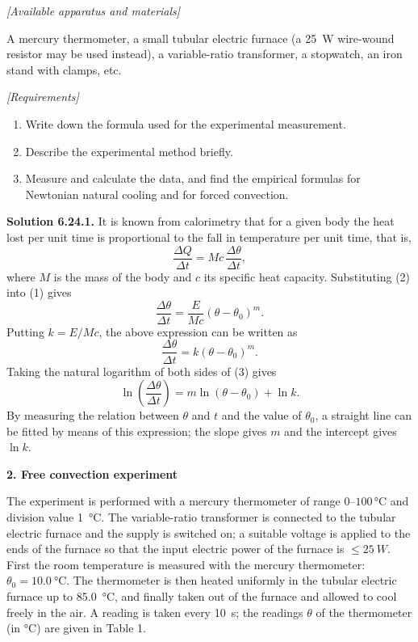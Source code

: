 \noindent\textit{[Available apparatus and materials]}

A mercury thermometer, a small tubular electric furnace (a \SI{25}{W} wire-wound resistor may be used instead), a variable-ratio transformer, a stopwatch, an iron stand with clamps, etc.

\noindent\textit{[Requirements]}
\begin{enumerate}[label=(\arabic*),leftmargin=2.2em,itemsep=1pt,topsep=2pt]
\item Write down the formula used for the experimental measurement.
\item Describe the experimental method briefly.
\item Measure and calculate the data, and find the empirical formulas for Newtonian natural cooling and for forced convection.
\end{enumerate}

\medskip
\noindent\textbf{Solution 6.24.}\quad \textbf{1.} It is known from calorimetry that for a given body the heat lost per unit time is proportional to the fall in temperature per unit time, that is,
\begin{equation}\tag{2}
\frac{\Delta Q}{\Delta t}=Mc\,\frac{\Delta\theta}{\Delta t},
\end{equation}
where $M$ is the mass of the body and $c$ its specific heat capacity. Substituting (2) into (1) gives
\begin{equation*}
\frac{\Delta\theta}{\Delta t}=\frac{E}{Mc}(\theta-\theta_0)^{m}.
\end{equation*}
Putting $k=E/Mc$, the above expression can be written as
\begin{equation}\tag{3}
\frac{\Delta\theta}{\Delta t}=k(\theta-\theta_0)^{m}.
\end{equation}
Taking the natural logarithm of both sides of (3) gives
\begin{equation*}
\ln\left(\frac{\Delta\theta}{\Delta t}\right)=m\ln(\theta-\theta_0)+\ln k .
\end{equation*}
By measuring the relation between $\theta$ and $t$ and the value of $\theta_0$, a straight line can be fitted by means of this expression; the slope gives $m$ and the intercept gives $\ln k$.

\textbf{2. Free convection experiment}

The experiment is performed with a mercury thermometer of range $0$--$100$\,\si{\celsius} and division value \SI{1}{\celsius}. The variable-ratio transformer is connected to the tubular electric furnace and the supply is switched on; a suitable voltage is applied to the ends of the furnace so that the input electric power of the furnace is $\le\SI{25}{W}$. First the room temperature is measured with the mercury thermometer: $\theta_0=\SI{10.0}{\celsius}$. The thermometer is then heated uniformly in the tubular electric furnace up to \SI{85.0}{\celsius}, and finally taken out of the furnace and allowed to cool freely in the air. A reading is taken every \SI{10}{s}; the readings $\theta$ of the thermometer (in \si{\celsius}) are given in Table 1.

